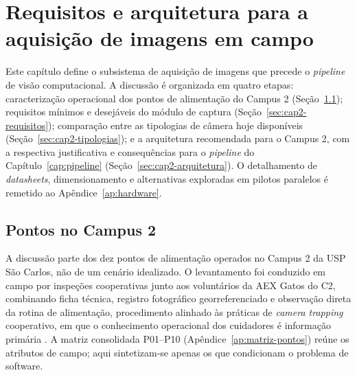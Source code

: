 \chapter{Requisitos e arquitetura para a aquisição de imagens em campo}
\label{cap:hardware}


Este capítulo define o subsistema de aquisição de imagens que precede o \textit{pipeline} de visão computacional. A discussão é organizada em quatro etapas: caracterização operacional dos pontos de alimentação do Campus 2 (Seção~\ref{sec:cap2-pontos}); requisitos mínimos e desejáveis do módulo de captura (Seção~\ref{sec:cap2-requisitos}); comparação entre as tipologias de câmera hoje disponíveis (Seção~\ref{sec:cap2-tipologias}); e a arquitetura recomendada para o Campus 2, com a respectiva justificativa e consequências para o \textit{pipeline} do Capítulo~\ref{cap:pipeline} (Seção~\ref{sec:cap2-arquitetura}). O detalhamento de \textit{datasheets}, dimensionamento e alternativas exploradas em pilotos paralelos é remetido ao Apêndice~\ref{ap:hardware}.


\section{Pontos no Campus 2}
\label{sec:cap2-pontos}


A discussão parte dos dez pontos de alimentação operados no Campus 2 da USP São Carlos, não de um cenário idealizado. O levantamento foi conduzido em campo por inspeções cooperativas junto aos voluntários da AEX Gatos do C2, combinando ficha técnica, registro fotográfico georreferenciado e observação direta da rotina de alimentação, procedimento alinhado às práticas de \textit{camera trapping} cooperativo, em que o conhecimento operacional dos cuidadores é informação primária \cite{velez2022choosing,cordier2022africa}. A matriz consolidada P01--P10 (Apêndice~\ref{ap:matriz-pontos}) reúne os atributos de campo; aqui sintetizam-se apenas os que condicionam o problema de software.


